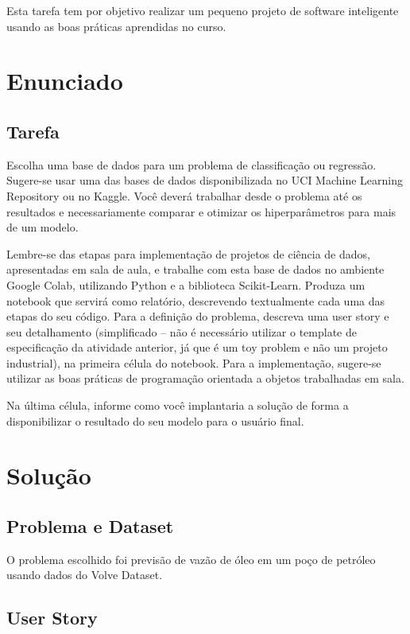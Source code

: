 \documentclass[10pt, a4paper]{article}
\begin{document}
Esta tarefa tem por objetivo realizar um pequeno projeto de software inteligente usando as boas práticas aprendidas no curso.

\section{Enunciado}

\subsection{Tarefa}

Escolha uma base de dados para um problema de classificação ou regressão. Sugere-se usar uma das bases de dados disponibilizada no UCI 
Machine Learning Repository ou no Kaggle. Você deverá trabalhar desde o problema até os resultados e necessariamente comparar e 
otimizar os hiperparâmetros para mais de um modelo.

Lembre-se das etapas para implementação de projetos de ciência de dados, apresentadas em sala de aula, e trabalhe com 
esta base de dados no ambiente Google Colab, utilizando Python e a biblioteca Scikit-Learn. Produza um notebook que servirá 
como relatório, descrevendo textualmente cada uma das etapas do seu código. Para a definição do problema, descreva uma user story 
e seu detalhamento (simplificado – não é necessário utilizar o template de especificação da atividade anterior, já que é um toy problem 
e não um projeto industrial), na primeira célula do notebook. Para a implementação, sugere-se utilizar as boas práticas de programação 
orientada a objetos trabalhadas em sala.

Na última célula, informe como você implantaria a solução de forma a disponibilizar o resultado do seu modelo para o usuário final.

\section{Solução}

\subsection{Problema e Dataset}

O problema escolhido foi previsão de vazão de óleo em um poço de petróleo usando dados do Volve Dataset.

\subsection{User Story}
\end{document}
